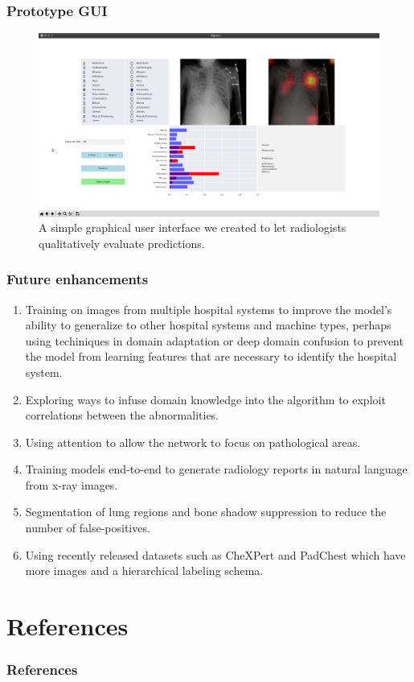 \documentclass[8pt]{beamer}
\begin{document}
\begin{frame}
  \frametitle{Prototype GUI}

  \begin{figure}[H]
    \centering \includegraphics[height=0.7\textheight]{images/pneumonia}
    \caption{A simple graphical user interface we created to let radiologists
      qualitatively evaluate predictions.}
    \label{screenshot}
  \end{figure}
  \end{frame}

\begin{frame}
  \frametitle{Future enhancements}

  \begin{enumerate}
  \item{Training on images from multiple hospital systems to improve the model's
      ability to generalize to other hospital systems and machine types, perhaps
      using techiniques in domain adaptation or deep domain confusion
      \cite{tzeng2014deep} to prevent the model from learning features that are
      necessary to identify the hospital system. }\pause
  \item{Exploring ways to infuse domain knowledge into the algorithm to exploit
      correlations between the abnormalities.}\pause
  \item{Using attention to allow the network to focus on pathological
      areas.}\pause
  \item{Training models end-to-end to generate radiology reports in natural
      language from x-ray images.}\pause
  \item{Segmentation of lung regions and bone shadow suppression to reduce the
      number of false-positives.}\pause
  \item{Using recently released datasets such as CheXPert\cite{Irvin2019} and
      PadChest\cite{Bustos2019} which have more images and a hierarchical
      labeling schema.}\pause
  \end{enumerate}

\section{References}
  
  \end{frame}
  \begin{frame}[allowframebreaks]
    \frametitle{References}
    \printbibliography
  \end{frame}
\end{document}
